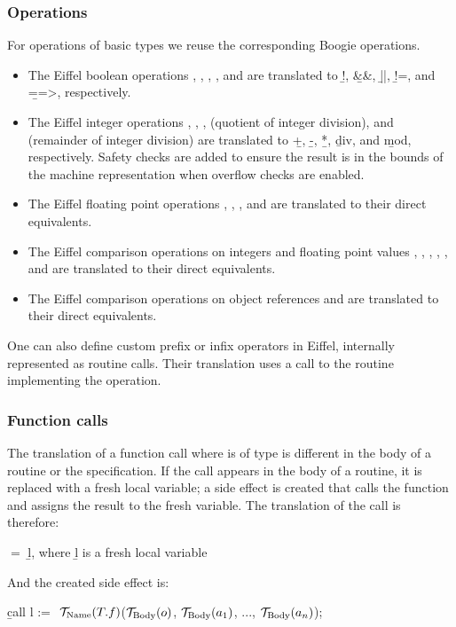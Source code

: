 \subsubsection{Operations}

For operations of basic types we reuse the corresponding Boogie operations.
\begin{itemize}
\item
The Eiffel boolean operations , , , , and  are translated to \b{!}, \b{\&\&}, \b{||}, \b{!=}, and \b{==>}, respectively.
\item
The Eiffel integer operations \e{+}, \e{-}, \e{*}, \e{//} (quotient of integer division), and \e{\\\\} (remainder of integer division) are translated to \b{+}, \b{-}, \b{*}, \b{div}, and \b{mod}, respectively. Safety checks are added to ensure the result is in the bounds of the machine representation when overflow checks are enabled.
\item
The Eiffel floating point operations \e{+}, \e{-}, \e{*}, and \e{/} are translated to their direct equivalents.
\item
The Eiffel comparison operations on integers and floating point values \e{=}, \e{/=}, \e{<}, \e{>}, \e{<=}, and \e{>=} are translated to their direct equivalents.
\item
The Eiffel comparison operations on object references \e{=} and \e{/=} are translated to their direct equivalents.
\end{itemize}

One can also define custom prefix or infix operators in Eiffel, internally represented as routine calls. Their translation uses a call to the routine implementing the operation.


\subsubsection{Function calls}

The translation of a function call  where  is of type  is different in the body of a routine or the specification. If the call appears in the body of a routine, it is replaced with a fresh local variable; a side effect is created that calls the function and assigns the result to the fresh variable. The translation of the call is therefore:
\begin{center}
 $=$ \b{l}, where \b{l} is a fresh local variable
\end{center}
And the created side effect is:
\begin{center}
\b{call l := $\ \ts{Name}{T.f}$($\ts{Body}{o}$, $\ts{Body}{a_1}$, ..., $\ts{Body}{a_n}$);}
\end{center}

